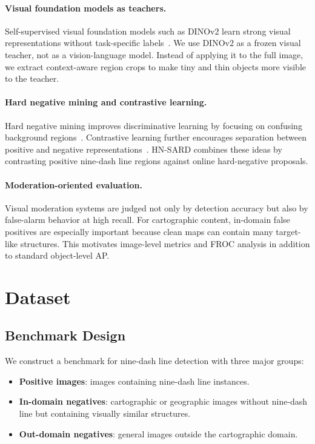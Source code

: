 \documentclass[conference,a4paper]{IEEEtran}
\begin{document}
\paragraph{Visual foundation models as teachers.}
Self-supervised visual foundation models such as DINOv2 learn strong visual representations without task-specific labels~\cite{oquab2024dinov2}.
We use DINOv2 as a frozen visual teacher, not as a vision-language model.
Instead of applying it to the full image, we extract context-aware region crops to make tiny and thin objects more visible to the teacher.

\paragraph{Hard negative mining and contrastive learning.}
Hard negative mining improves discriminative learning by focusing on confusing background regions~\cite{shrivastava2016training}.
Contrastive learning further encourages separation between positive and negative representations~\cite{oord2018representation}.
HN-SARD combines these ideas by contrasting positive nine-dash line regions against online hard-negative proposals.

\paragraph{Moderation-oriented evaluation.}
Visual moderation systems are judged not only by detection accuracy but also by false-alarm behavior at high recall.
For cartographic content, in-domain false positives are especially important because clean maps can contain many target-like structures.
This motivates image-level metrics and FROC analysis in addition to standard object-level AP.

\section{Dataset}

\subsection{Benchmark Design}

We construct a benchmark for nine-dash line detection with three major groups:
\begin{itemize}
    \item \textbf{Positive images}: images containing nine-dash line instances.
    \item \textbf{In-domain negatives}: cartographic or geographic images without nine-dash line but containing visually similar structures.
    \item \textbf{Out-domain negatives}: general images outside the cartographic domain.
\end{itemize}
\end{document}
